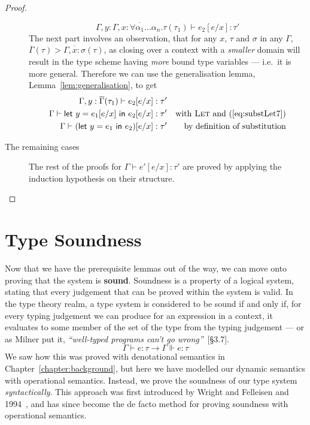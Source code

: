 \begin{proof}
\begin{description}
  \[ \Gamma , y : \overline{\Gamma, x : \forall\alpha_1\ldots\alpha_n.\tau}(\tau_1) \vdash e_2 [e/x] : \tau' \]
  The next part involves an observation, that for any $x$, $\tau$ and $\sigma$ in
  any $\Gamma$, ${\overline{\Gamma}(\tau) > \overline{\Gamma, x : \sigma}(\tau)}$, as closing
  over a context with a \textit{smaller} domain will result in the
  type scheme having \textit{more} bound type variables --- i.e.\ it is
  more general. Therefore we can use the generalisation lemma,
  Lemma~\ref{lem:generalisation}, to get
  \begin{align*}
    \Gamma , y : \overline{\Gamma}(\tau_1) \vdash e_2[e/x] : \tau' \\
    \Gamma \vdash \mathsf{let} \ y = e_1[e/x] \ \mathsf{in} \ e_2[e/x] : \tau' && \text{with \textsc{Let}
                                               and
                                               (\ref{eq:substLet7})}
    \\
    \Gamma \vdash (\mathsf{let} \ y = e_1 \ \mathsf{in} \ e_2)[e/x] : \tau' && \text{by definition of substitution}
  \end{align*}
  
  \item[The remaining cases] The rest of the proofs for $\Gamma \vdash e'[e/x] :
    \tau'$ are proved by applying the induction hypothesis on their structure.
  \end{description}
\end{proof}

\section{Type Soundness}\label{sec:type-soundness}

Now that we have the prerequisite lemmas out of the way, we can move
onto proving that the system is \textbf{sound}. Soundness is a
property of a logical system, stating that every judgement that can be
proved within the system is valid. In the type theory realm, a type
system is considered to be sound if and only if, for every typing
judgement we can produce for an expression in a context, it evaluates
to some member of the set of the type from the typing judgement --- or
as Milner put it, \textit{``well-typed programs can't go
  wrong''}~\cite{milner1978}[§3.7].
\[\Gamma \vdash e : \tau \rightarrow \Gamma \Vdash e : \tau\]
We saw how this was proved with denotational semantics in
Chapter~\ref{chapter:background}, but here we have modelled our
dynamic semantics with operational semantics.  Instead, we prove the
soundness of our type system \textit{syntactically}. This approach was
first introduced by Wright and Felleisen and 1994~\cite{wright1994},
and has since become the de facto method for proving soundness
with operational semantics.

